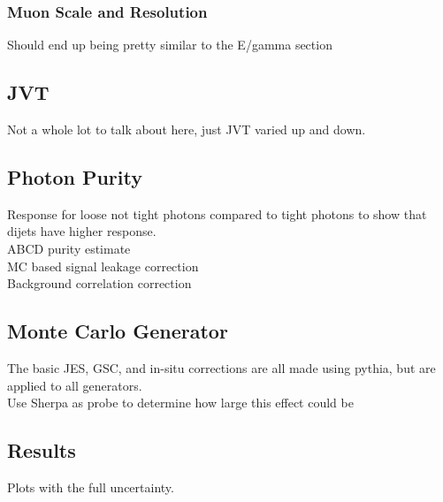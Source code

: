 \subsubsection{Muon Scale and Resolution}
Should end up being pretty similar to the E/gamma section

\subsection{JVT}
Not a whole lot to talk about here, just JVT varied up and down.  

\subsection{Photon Purity}

Response for loose not tight photons compared to tight photons to show that dijets have higher response.  \\
ABCD purity estimate \\
MC based signal leakage correction \\
Background correlation correction \\

\subsection{Monte Carlo Generator}

The basic JES, GSC, and in-situ corrections are all made using pythia, but are applied to all generators. \\
Use Sherpa as probe to determine how large this effect could be


\subsection{Results}

Plots with the full uncertainty.  


